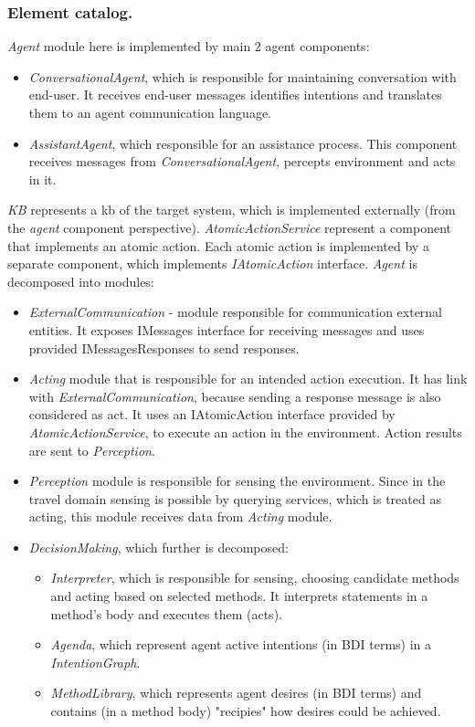 \documentclass{llncs}
\begin{document}
\subsubsection{Element catalog.}
 \emph{Agent} module here is implemented by main 2 agent components: \begin{itemize}
	\item \emph{ConversationalAgent}, which is responsible for maintaining conversation with end-user. It receives end-user messages identifies intentions and translates them to an agent communication language.
	\item \emph{AssistantAgent}, which responsible for an assistance process. This component receives messages from \emph{ConversationalAgent}, percepts environment and acts in it.
\end{itemize}
\emph{KB} represents a \gls{kb} of the target system, which is implemented externally (from the \emph{agent} component perspective).
\emph{AtomicActionService} represent a component that implements an atomic action. Each atomic action is implemented by a separate component, which implements \emph{IAtomicAction} interface.
\emph{Agent} is decomposed into modules: \begin{itemize}
	\item \emph{ExternalCommunication} - module responsible for communication external entities. It exposes IMessages interface for receiving messages and uses provided IMessagesResponses to send responses.
	\item \emph{Acting} module that is responsible for an intended action execution. It has link with \emph{ExternalCommunication}, because sending a response message is also considered as act. It uses an IAtomicAction interface provided by \emph{AtomicActionService}, to execute an action in the environment. Action results are sent to \emph{Perception}. 
	\item \emph{Perception} module is responsible for sensing the environment. Since in the travel domain sensing is possible by querying services, which is treated as acting, this module receives data from \emph{Acting} module.
	\item \emph{DecisionMaking}, which further is decomposed: \begin{itemize}
		\item \emph{Interpreter}, which is responsible for sensing, choosing candidate methods and acting based on selected methods. It interprets statements in a method's body and executes them (acts).
		\item \emph{Agenda}, which represent agent active intentions (in \gls{BDI} terms) in a \emph{IntentionGraph}.  %
		\item \emph{MethodLibrary}, which represents agent desires (in \gls{BDI} terms) and contains (in a method body) "recipies" how desires could be achieved.
	\end{itemize}
\end{itemize}
\end{document}
